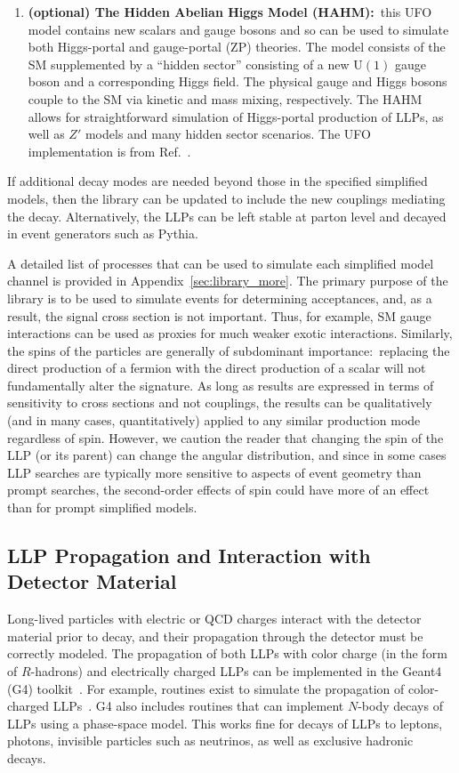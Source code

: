 \begin{enumerate}
\item{\bf (optional) The Hidden Abelian Higgs Model (HAHM):}~this UFO model contains new scalars and gauge bosons and so can be used to simulate both Higgs-portal and gauge-portal (ZP) theories.
The model consists of the SM supplemented by a ``hidden sector'' consisting of a new $\mathrm{U}(1)$ gauge boson and a corresponding Higgs field.
The physical gauge and Higgs bosons couple to the SM via kinetic and mass mixing, respectively.
The HAHM allows for straightforward simulation of Higgs-portal production of LLPs, as well as $Z'$ models and many hidden sector scenarios.
The UFO implementation is from Ref.~\cite{Curtin:2014cca}.

\end{enumerate}
%
If additional decay modes are needed beyond those in the specified simplified models, then the library can be updated to include the new couplings mediating the decay.
Alternatively, the LLPs can be left stable at parton level and decayed in event generators such as Pythia.


A detailed list of processes that can be used to simulate each simplified model channel is provided in Appendix~\ref{sec:library_more}.
The primary purpose of the library is to be used to simulate events for determining acceptances, and, as a result, the signal cross section is not important.
Thus, for example, SM gauge interactions can be used as proxies for much weaker exotic interactions.
Similarly, the spins of the particles are generally of subdominant importance:~replacing the direct production of a fermion with the direct production of a scalar will not fundamentally alter the signature.
As long as results are expressed in terms of sensitivity to cross sections and not couplings, the results can be qualitatively (and in many cases, quantitatively) applied to any similar production mode regardless of spin.
However, we caution the reader that changing the spin of the LLP (or its parent) can change the angular distribution, and since in some cases LLP searches are typically more sensitive to aspects of event geometry than prompt searches, the second-order effects of spin could have more of an effect than for prompt simplified models.

\subsection{LLP Propagation and Interaction with Detector Material}\label{sec:geant}

Long-lived particles with electric or QCD charges interact with the detector material prior to decay, and their propagation through the detector must be correctly modeled.
The propagation of both LLPs with color charge (in the form of $R$-hadrons) and electrically charged LLPs can be implemented in the Geant4 (G4) toolkit~\cite{Agostinelli:2002hh}.
For example, routines exist to simulate the propagation of color-charged LLPs~\cite{Mackeprang:2006gx,Mackeprang:2009ad}.
G4 also includes routines that can implement $N$-body decays of LLPs using a phase-space model.
This works fine for decays of LLPs to leptons, photons, invisible particles such as neutrinos, as well as exclusive hadronic decays. 

